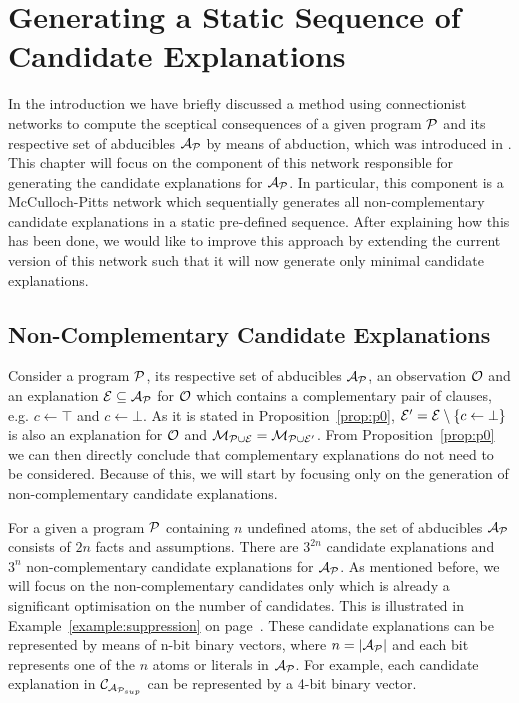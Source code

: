 
\chapter{Generating a Static Sequence of Candidate Explanations}
\label{sec:cn}

In the introduction we have briefly discussed a method using connectionist networks to compute the sceptical consequences of a given program $\mathcal{P}$ and its respective set of abducibles $\mathcal{A}_{\mathcal{P}}$ by means of abduction, which was introduced in \cite{corepaper}. This chapter will focus on the component of this network responsible for generating the candidate explanations for $\mathcal{A}_{\mathcal{P}}$. In particular, this component is a McCulloch-Pitts network \cite{mcculloch1943logical} which sequentially generates all non-complementary candidate explanations in a static pre-defined sequence. After explaining how this has been done, we would like to improve this approach by extending the current version of this network such that it will now generate only minimal candidate explanations.

\section{Non-Complementary Candidate Explanations}
\label{sec:cn:ncce}

Consider a program $\mathcal{P}$, its respective set of abducibles $\mathcal{A}_{\mathcal{P}}$, an observation $\mathcal{O}$ and an explanation $\mathcal{E} \subseteq \mathcal{A}_{\mathcal{P}}$ for $\mathcal{O}$ which contains a complementary pair of clauses, e.g. $c \leftarrow \top$ and $c \leftarrow \bot$. As it is stated in Proposition~\ref{prop:p0}, $\mathcal{E}'= \mathcal{E} \setminus \{c \leftarrow \bot\}$ is also an explanation for $\mathcal{O}$ and $\mathcal{M}_{\mathcal{P} \cup \mathcal{E}} = \mathcal{M}_{\mathcal{P} \cup \mathcal{E}'}$. From Proposition~\ref{prop:p0} we can then directly conclude that complementary explanations do not need to be considered. Because of this, we will start by focusing only on the generation of non-complementary candidate explanations.

For a given a program $\mathcal{P}$ containing $n$ undefined atoms, the set of abducibles $\mathcal{A}_{\mathcal{P}}$ consists of $2n$ facts and assumptions. There are $3^{2n}$ candidate explanations and $3^n$ non-complementary candidate explanations for $\mathcal{A}_{\mathcal{P}}$. As mentioned before, we will focus on the non-complementary candidates only which is already a significant optimisation on the number of candidates. This is illustrated in Example~\ref{example:suppression} on page~\pageref{example:suppression}. These candidate explanations can be represented by means of n-bit binary vectors, where $n = |\mathcal{A}_{\mathcal{P}}|$ and each bit represents one of the $n$ atoms or literals in $\mathcal{A}_{\mathcal{P}}$. For example, each candidate explanation in $\mathcal{C}_{\mathcal{A}_{\mathcal{P}_{sup}}}$ can be represented by a 4-bit binary vector.

